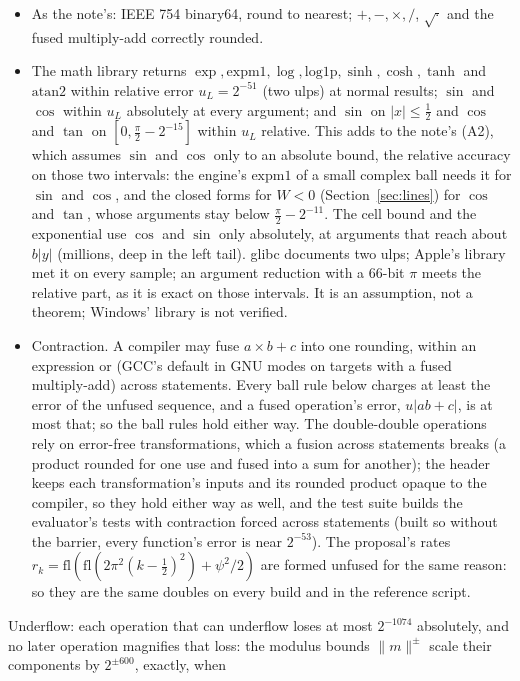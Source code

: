 \documentclass[11pt]{article}
\theoremstyle{definition}
\newcommand{\fl}{\mathrm{fl}}
\newcommand{\lop}{\mathrm{log1p}}
\newcommand{\emo}{\mathrm{expm1}}
\begin{document}
\begin{itemize}
\item[(A1)] As the note's: IEEE 754 binary64, round to nearest; $+,-,\times,/$, $\sqrt{\cdot}$ and the fused
multiply-add correctly rounded.
\item[(A2$_{\mathrm s}$)] The math library returns $\exp,\emo,\log,\lop,\sinh,\cosh,\tanh$ and $\mathrm{atan2}$
within relative error $u_L=2^{-51}$ (two ulps) at normal results; $\sin$ and $\cos$ within $u_L$ absolutely at every
argument; and $\sin$ on $|x|\le\frac12$ and $\cos$ and $\tan$ on $[0,\frac\pi2-2^{-15}]$ within $u_L$ relative.
This adds to the note's (A2), which assumes $\sin$ and $\cos$ only to an absolute bound, the relative accuracy on
those two intervals: the engine's $\emo$ of a small complex ball needs it for $\sin$ and $\cos$, and the closed
forms for $W<0$ (Section~\ref{sec:lines}) for $\cos$ and $\tan$, whose arguments stay below $\frac\pi2-2^{-11}$.
The cell bound and the exponential use $\cos$ and $\sin$ only absolutely, at arguments that reach about $b|y|$
(millions, deep in the left tail). glibc documents two ulps; Apple's library met it on every sample; an argument
reduction with a 66-bit $\pi$ meets the relative part, as it is exact on those intervals. It is an assumption, not a
theorem; Windows' library is not verified.
\item[(A3)] Contraction. A compiler may fuse $a\times b+c$ into one rounding, within an expression or (GCC's
default in GNU modes on targets with a fused multiply-add) across statements. Every ball rule below charges at
least the error of the unfused sequence, and a fused operation's error, $u|ab+c|$, is at most that; so the ball
rules hold either way. The double-double operations rely on error-free transformations, which a fusion across
statements breaks (a product rounded for one use and fused into a sum for another); the header keeps each
transformation's inputs and its rounded product opaque to the compiler, so they hold either way as well, and the
test suite builds the evaluator's tests with contraction forced across statements (built so without the barrier,
every function's error is near $2^{-53}$). The proposal's rates $r_k=\fl(\fl(2\pi^2(k-\frac12)^2)+\psi^2/2)$ are
formed unfused for the same reason: so they are the same doubles on every build and in the reference script.
\end{itemize}
Underflow: each operation that can underflow loses at most $2^{-1074}$ absolutely, and no later operation
magnifies that loss: the modulus bounds $\|m\|^\pm$ scale their components by $2^{\pm600}$, exactly, when
\end{document}
